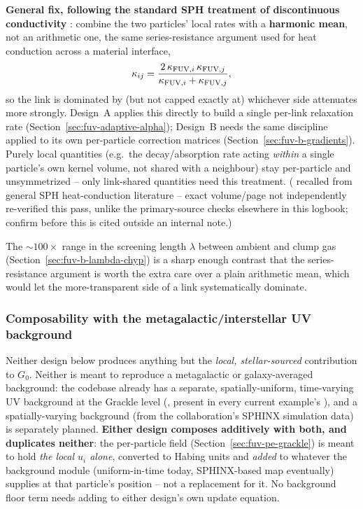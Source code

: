 \textbf{General fix, following the standard SPH treatment of
discontinuous conductivity} \citep{ClearyMonaghan1999}: combine the two
particles' local rates with a \textbf{harmonic mean}, not an
arithmetic one, the same series-resistance argument used for heat
conduction across a material interface,
\begin{equation}
  \kappa_{ij} = \frac{2\,\kappa_{{\rm FUV},i}\,\kappa_{{\rm FUV},j}}
                     {\kappa_{{\rm FUV},i}+\kappa_{{\rm FUV},j}},
  \label{eq:fuv-harmonic-mean}
\end{equation}
so the link is dominated by (but not capped exactly at) whichever side
attenuates more strongly. Design~A applies this directly to build a
single per-link relaxation rate (Section~\ref{sec:fuv-adaptive-alpha});
Design~B needs the same discipline applied to its own per-particle
correction matrices (Section~\ref{sec:fuv-b-gradients}). Purely local
quantities (e.g.\ the decay/absorption rate acting \emph{within} a
single particle's own kernel volume, not shared with a neighbour) stay
per-particle and unsymmetrized -- only link-shared quantities need
this treatment. (\citet{ClearyMonaghan1999} recalled from general SPH
heat-conduction literature -- exact volume/page not independently
re-verified this pass, unlike the primary-source checks elsewhere in
this logbook; confirm before this is cited outside an internal note.)

The $\sim100\times$ range in the screening length $\lambda$ between
ambient and clump gas (Section~\ref{sec:fuv-b-lambda-chyp}) is a sharp
enough contrast that the series-resistance argument is worth the extra
care over a plain arithmetic mean, which would let the more-transparent
side of a link systematically dominate.

\subsubsection{Composability with the metagalactic/interstellar UV
background}
\label{sec:fuv-background-composability}

Neither design below produces anything but the \emph{local,
stellar-sourced} contribution to $G_0$. Neither is meant to reproduce a
metagalactic or galaxy-averaged background: the codebase already has a
separate, spatially-uniform, time-varying UV background at the Grackle
level (, present in every
current example's ), and a spatially-varying
background (from the collaboration's SPHINX simulation data) is
separately planned. \textbf{Either design composes additively with
both, and duplicates neither}: the per-particle 
field (Section~\ref{sec:fuv-pe-grackle}) is meant to hold \emph{the
local $u_i$ alone}, converted to Habing units and \emph{added} to
whatever the background module (uniform-in-time today, SPHINX-based
map eventually) supplies at that particle's position -- not a
replacement for it. No background floor term needs adding to either
design's own update equation.

